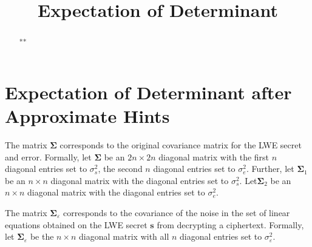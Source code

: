 \documentclass{llncs}[11pt]
\numberwithin{theorem}{section} %
\renewcommand\vec{\mathbf}
\newcommand{\eps}{\varepsilon}
\numberwithin{myclaimctr}{section}
\begin{document}

\title{Expectation of Determinant}

\author{
}

\institute{
}


\maketitle


\begin{abstract}
**
\end{abstract}


%
%

\section{Expectation of Determinant after Approximate Hints}

The matrix $\vec{\Sigma}$ corresponds to the original covariance matrix for the LWE secret and error.
Formally, let $\vec{\Sigma}$ be an $2n \times 2n$ diagonal matrix with the first $n$ diagonal entries set to
$\sigma^2_s$, the second $n$ diagonal entries set to $\sigma^2_e$.
Further, let $\vec{\Sigma}_1$ be an $n \times n$ diagonal matrix with the diagonal entries set to
$\sigma^2_s$.
Let$\vec{\Sigma}_2$ be an $n \times n$ diagonal matrix with the diagonal entries set to
$\sigma^2_e$.

The matrix $\vec{\Sigma}_{\eps}$ corresponds to the covariance of the noise in the set of linear equations obtained on the LWE
secret $\vec{s}$ from decrypting a ciphertext.
Formally, let $\vec{\Sigma}_{\eps}$ be the $n \times n$ diagonal matrix with all $n$ diagonal entries set to $\sigma^2_{\eps}$.
\end{document}
